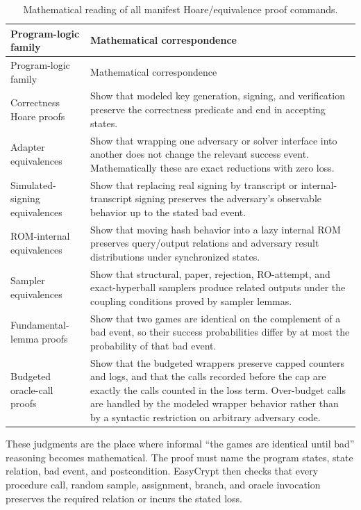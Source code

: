 \begin{longtable}{p{}p{}}
\caption{Mathematical reading of all manifest Hoare/equivalence proof commands.}
\label{tab:hoare-correspondence}\\
\toprule
Program-logic family & Mathematical correspondence \\
\midrule
\endfirsthead
\toprule
Program-logic family & Mathematical correspondence \\
\midrule
\endhead
Correctness Hoare proofs &
Show that modeled key generation, signing, and verification preserve the
correctness predicate and end in accepting states. \\
Adapter equivalences &
Show that wrapping one adversary or solver interface into another does not
change the relevant success event.  Mathematically these are exact reductions
with zero loss. \\
Simulated-signing equivalences &
Show that replacing real signing by transcript or internal-transcript signing
preserves the adversary's observable behavior up to the stated bad event. \\
ROM-internal equivalences &
Show that moving hash behavior into a lazy internal ROM preserves query/output
relations and adversary result distributions under synchronized states. \\
Sampler equivalences &
Show that structural, paper, rejection, RO-attempt, and exact-hyperball samplers
produce related outputs under the coupling conditions proved by sampler lemmas. \\
Fundamental-lemma proofs &
Show that two games are identical on the complement of a bad event, so their
success probabilities differ by at most the probability of that bad event. \\
Budgeted oracle-call proofs &
Show that the budgeted wrappers preserve capped counters and logs, and that the
calls recorded before the cap are exactly the calls counted in the loss term.
Over-budget calls are handled by the modeled wrapper behavior rather than by a
syntactic restriction on arbitrary adversary code. \\
\bottomrule
\end{longtable}

These judgments are the place where informal ``the games are identical until
bad'' reasoning becomes mathematical.  The proof must name the program states,
state relation, bad event, and postcondition.  EasyCrypt then checks that every
procedure call, random sample, assignment, branch, and oracle invocation
preserves the required relation or incurs the stated loss.

